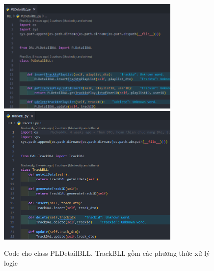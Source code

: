 \documentclass[a4paper]{article}
\begin{document}
\clearpage
\newpage
\begin{figure}[h]
	\centering
	\includegraphics[width=0.8\textwidth]{images/PlayListDetailBLL.png}
	\includegraphics[width=0.8\textwidth]{images/TrackBLL.png}
	\caption{Code cho class PLDetailBLL, TrackBLL gồm các phương thức xử lý logic}
\end{figure}
\clearpage
\newpage
\end{document}
